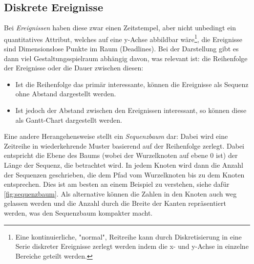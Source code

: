	\subsection{Diskrete Ereignisse}
		Bei \emph{Ereignissen} haben diese zwar einen Zeitstempel, aber nicht unbedingt ein quantitatives Attribut, welches auf eine y-Achse abbildbar wäre\footnote{Eine kontinuierliche, "normal", Reitreihe kann durch Diskretisierung in eine Serie diskreter Ereignisse zerlegt werden indem die x- und y-Achse in einzelne Bereiche geteilt werden.}, \dh die Ereignisse sind Dimensionslose Punkte im Raum (\bspw Deadlines). Bei der Darstellung gibt es dann viel Gestaltungsspielraum abhängig davon, was relevant ist: die Reihenfolge der Ereignisse oder die Dauer zwischen diesen:
		\begin{itemize}
			\item Ist die Reihenfolge das primär interessante, können die Ereignisse als Sequenz ohne Abstand dargestellt werden.
			\item Ist jedoch der Abstand zwischen den Ereignissen interessant, so können diese als Gantt-Chart dargestellt werden.
		\end{itemize}
		Eine andere Herangehensweise stellt ein \emph{Sequenzbaum} dar: Dabei wird eine Zeitreihe in wiederkehrende Muster basierend auf der Reihenfolge zerlegt. Dabei entspricht die Ebene des Baums (wobei der Wurzelknoten auf ebene 0 ist) der Länge der Sequenz, die betrachtet wird. In jedem Knoten wird dann die Anzahl der Sequenzen geschrieben, die dem Pfad vom Wurzelknoten bis zu dem Knoten entsprechen. Dies ist am besten an einem Beispiel zu verstehen, siehe dafür \autoref{fig:sequenzbaum}. Als alternative können die Zahlen in den Knoten auch weg gelassen werden und die Anzahl durch die Breite der Kanten repräsentiert werden, was den Sequenzbaum kompakter macht.


